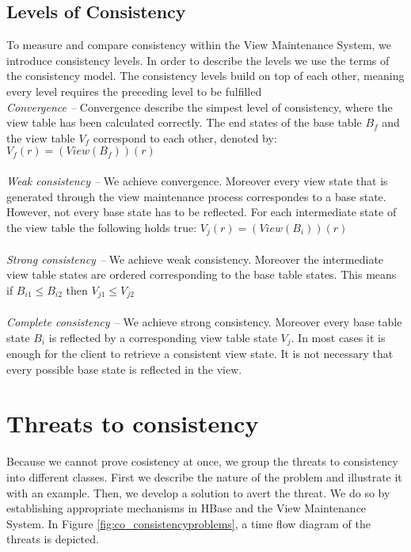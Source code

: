 \documentclass[11pt,a4paper,bibtotoc,idxtotoc,headsepline,footsepline,footexclude,BCOR12mm,DIV13]{scrbook}
\begin{document}
\subsection{Levels of Consistency}
To measure and compare consistency within the View Maintenance System, we introduce consistency levels.  In order to describe the levels we use the terms of the consistency model. The consistency levels build on top of each other, meaning every level requires the preceding level to be fulfilled\\
\noindent  
\emph{Convergence -- }Convergence describe the simpest level of consistency, where the view table has been calculated correctly. The end states of the base table $B_f$ and the view table $V_f$ correspond to each other, denoted by: $V_f(r) = (View(B_f))(r)$\\\\
\emph{Weak consistency -- }We achieve convergence. Moreover every view state that is generated through the view maintenance process correspondes to a base state. However, not every base state has to be reflected. For each intermediate state of the view table the following holds true: $V_j(r) = (View(B_i))(r)$\\\\
\emph{Strong consistency -- }We achieve weak consistency. Moreover the intermediate view table states are ordered corresponding to the base table states. This means if $B_{i1} \leq  B_{i2}$ then $V_{j1} \leq V_{j2}$\\\\
\emph{Complete consistency -- }We achieve strong consistency. Moreover every base table state $B_i$ is reflected by a corresponding view table state $V_j$. In most cases it is enough for the client to retrieve a consistent view state. It is not necessary that every possible base state is reflected in the view.

\section{Threats to consistency}
\label{sec:threatstoconsistency}
Because we cannot prove cosistency at once, we group the threats to consistency into different classes. First we describe the nature of the problem and illustrate it with an example. Then, we develop a solution to avert the threat. We do so by establishing appropriate mechanisms in HBase and the View Maintenance System. In Figure \ref{fig:co_consistencyproblems}, a time flow diagram of the threats is depicted.\\
 
\end{document}
